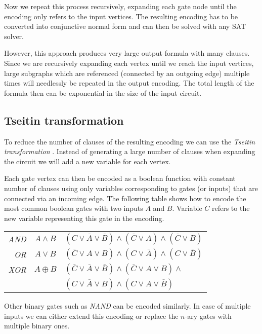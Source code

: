 Now we repeat this process recursively, expanding each gate node until the encoding only refers to the input vertices.
The resulting encoding has to be converted into conjunctive normal form and can then be solved with any SAT solver.

However, this approach produces very large output formula with many clauses.
Since we are recursively expanding each vertex until we reach the input vertices, large subgraphs which are referenced (connected by an outgoing edge) multiple times will needlessly be repeated in the output encoding.
The total length of the formula then can be exponential in the size of the input circuit.

\subsection{Tseitin transformation}
\label{sec:tseitin}
To reduce the number of clauses of the resulting encoding we can use the \emph{Tseitin transformation} \cite{tseitin1983complexity}.
Instead of generating a large number of clauses when expanding the circuit we will add a new variable for each vertex.

Each gate vertex can then be encoded as a boolean function with constant number of clauses using only variables corresponding to gates (or inputs) that are connected via an incoming edge.
The following table shows how to encode the most common boolean gates with two inputs $A$ and $B$.
Variable $C$ refers to the new variable representing this gate in the encoding.

\begin{tabular}{r c l}
\emph{AND}& $A\land B$ & $(C \lor \overline{A} \lor \overline{B}) \land (\overline{C} \lor A) \land (\overline{C} \lor B)$ \\
\emph{OR} & $A\lor B$ & $(\overline{C} \lor A \lor B) \land (C \lor \overline{A}) \land (C \lor \overline{B})$ \\
\emph{XOR} & $A\oplus B$ & $(\overline{C} \lor \overline{A} \lor \overline{B}) \land (\overline{C} \lor A \lor B) \land$\\
& & $(C \lor \overline{A} \lor B) \land (C \lor A \lor \overline{B})$
\end{tabular}

Other binary gates such as \emph{NAND} can be encoded similarly.
In case of multiple inputs we can either extend this encoding or replace the $n$-ary gates with multiple binary ones.

